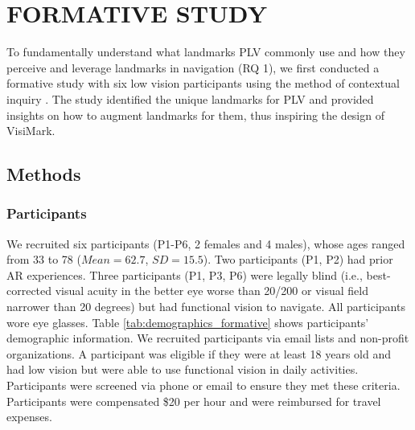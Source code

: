 \section{FORMATIVE STUDY}
To fundamentally understand what landmarks PLV commonly use and how they perceive and leverage landmarks in navigation (RQ 1), we first conducted a formative study with six low vision participants using the method of contextual inquiry \cite{karen2017contextual}. The study identified the unique landmarks for PLV and provided insights on how to augment landmarks for them, thus inspiring the design of VisiMark.


\subsection{Methods}

\subsubsection{Participants}
We recruited six participants (P1-P6, 2 females and 4 males), whose ages ranged from 33 to 78 ($Mean = 62.7$, $SD = 15.5$). Two participants (P1, P2) had prior AR experiences. Three participants (P1, P3, P6) were legally blind (i.e., best-corrected visual acuity in the better eye worse than 20/200 or visual field narrower than 20 degrees) but had functional vision to navigate. All participants wore eye glasses. Table \ref{tab:demographics_formative} shows participants’ demographic information. We recruited participants via email lists and non-profit organizations. A participant was eligible if they were at least 18 years old and had low vision but were able to use functional vision in daily activities. Participants were screened via phone or email to ensure they met these criteria. Participants were compensated \$20 per hour and were reimbursed for travel expenses. 

